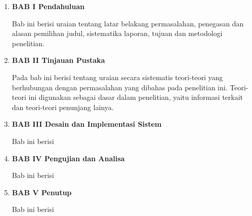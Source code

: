 \begin{enumerate}[nolistsep]

  \item \textbf{BAB I Pendahuluan}

  Bab ini berisi uraian tentang latar belakang permasalahan, penegasan dan alasan pemilihan judul, sistematika laporan, tujuan dan metodologi penelitian.

  \vspace{2ex}

  \item \textbf{BAB II Tinjauan Pustaka}

  Pada bab ini berisi tentang uraian secara sistematis teori-teori yang berhubungan dengan permasalahan yang dibahas pada penelitian ini. Teori-teori ini digunakan sebagai dasar dalam penelitian, yaitu informasi terkait 
  dan teori-teori penunjang lainya.

  \vspace{2ex}

  \item \textbf{BAB III Desain dan Implementasi Sistem}

  Bab ini berisi \lipsum[4][1-5]

  \vspace{2ex}

  \item \textbf{BAB IV Pengujian dan Analisa}

  Bab ini berisi \lipsum[5][1-5]

  \vspace{2ex}

  \item \textbf{BAB V Penutup}

  Bab ini berisi \lipsum[6][1-5]

\end{enumerate}
